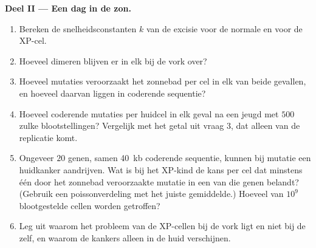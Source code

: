 \begin{problem}
\medskip
\noindent\textbf{Deel II --- Een dag in de zon.}
\begin{enumerate}[resume]
  \item Bereken de snelheidsconstanten $k$ van de excisie voor de
        normale en voor de XP-cel.
  \item Hoeveel dimeren blijven er in elk bij de vork over?
  \item Hoeveel mutaties veroorzaakt het zonnebad per cel in elk van
        beide gevallen, en hoeveel daarvan liggen in coderende
        sequentie?
  \item Hoeveel coderende mutaties per huidcel in elk geval na een
        jeugd met $500$ zulke blootstellingen? Vergelijk met het getal
        uit vraag 3, dat alleen van de replicatie komt.
  \item Ongeveer $20$ genen, samen \qty{40}{kb} coderende sequentie,
        kunnen bij mutatie een huidkanker aandrijven. Wat is bij het
        XP-kind de kans per cel dat minstens één door het zonnebad
        veroorzaakte mutatie in een van die genen belandt? (Gebruik
        een poissonverdeling met het juiste gemiddelde.) Hoeveel van
        $10^{9}$ blootgestelde cellen worden getroffen?
  \item Leg uit waarom het probleem van de XP-cellen bij de vork ligt
        en niet bij de  zelf, en waarom de kankers alleen in de
        huid verschijnen.
\end{enumerate}


\end{problem}
